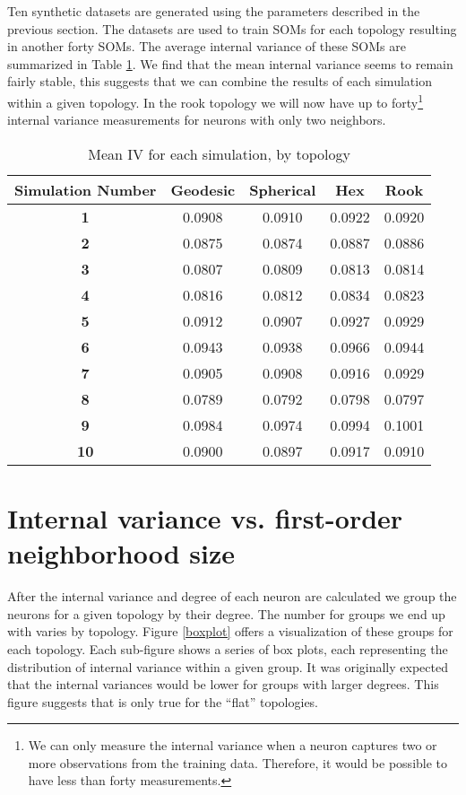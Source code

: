 Ten synthetic datasets are generated using the parameters described in the
previous section. The datasets are used to train SOMs for each topology
resulting in another forty SOMs. The average internal variance of these SOMs
are summarized in Table \ref{ivtable3}.  We find that the mean internal
variance seems to remain fairly stable, this suggests that we can combine the
results of each simulation within a given topology. In the rook topology we
will now have up to forty\footnote{We can only measure the internal variance
when a neuron captures two or more observations from the training data.
Therefore, it would be possible to have less than forty measurements.}
internal variance measurements for neurons with only two neighbors.

\begin{table}[hbt]
\centering
\caption{Mean IV for each simulation, by topology}
\label{ivtable3}
\begin{tabular}{|c||c|c|c|c|}
\hline
\textbf{Simulation Number} & Geodesic & Spherical & Hex & Rook \\
\hline
\hline
\textbf{1} & 0.0908 & 0.0910 & 0.0922 & 0.0920 \\
\hline
\textbf{2} & 0.0875 & 0.0874 & 0.0887 & 0.0886 \\
\hline
\textbf{3} & 0.0807 & 0.0809 & 0.0813 & 0.0814 \\
\hline
\textbf{4} & 0.0816 & 0.0812 & 0.0834 & 0.0823 \\
\hline
\textbf{5} & 0.0912 & 0.0907 & 0.0927 & 0.0929 \\
\hline
\textbf{6} & 0.0943 & 0.0938 & 0.0966 & 0.0944 \\
\hline
\textbf{7} & 0.0905 & 0.0908 & 0.0916 & 0.0929 \\
\hline
\textbf{8} & 0.0789 & 0.0792 & 0.0798 & 0.0797 \\
\hline
\textbf{9} & 0.0984 & 0.0974 & 0.0994 & 0.1001 \\
\hline
\textbf{10} & 0.0900 & 0.0897 & 0.0917 & 0.0910 \\
\hline
\end{tabular} \end{table}

\section{Internal variance vs. first-order neighborhood size}
After the internal variance and degree of each neuron are calculated we
group the neurons for a given topology by their degree. The number for groups
we end up with varies by topology. Figure \ref{boxplot} offers a visualization
of these groups for each topology.  Each sub-figure shows a series of box
plots, each representing the distribution of internal variance within a given
group.  It was originally expected that the internal variances would be lower
for groups with larger degrees. This figure suggests that is only true for the
``flat'' topologies.

